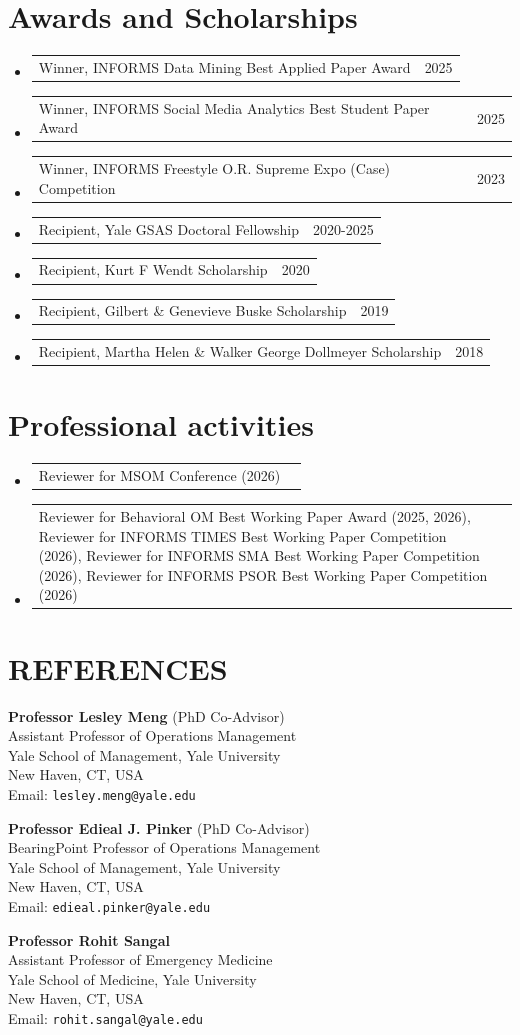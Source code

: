 \documentclass[letterpaper,11pt]{article}
\makeatletter
\newlength{\cvrowwidth}\setlength{\cvrowwidth}{0.97\textwidth}
\newcommand{\resumeProjectHeading}[2]{
    \item
    \begin{tabularx}{\cvrowwidth}{@{}>{\raggedright\arraybackslash\small}X@{\hspace{1em}}r@{}}
      #1 & #2 \\
    \end{tabularx}\vspace{-7pt}
}
\newcommand{\resumeSubHeadingListStartFlush}{\setlength{\cvrowwidth}{\textwidth}\begin{itemize}[leftmargin=0pt, label={}]}
\newcommand{\resumeSubHeadingListEnd}{\end{itemize}}
\makeatother
\begin{document}
\section{Awards and Scholarships}
\resumeSubHeadingListStartFlush
        \resumeProjectHeading{Winner, INFORMS Data Mining Best Applied Paper Award}{2025}
        \resumeProjectHeading
        {Winner, INFORMS Social Media Analytics Best Student Paper Award}{2025}
        \resumeProjectHeading
        {Winner, INFORMS Freestyle O.R. Supreme Expo (Case) Competition}{2023}
        \resumeProjectHeading
        {Recipient, Yale GSAS Doctoral Fellowship}{2020-2025}
        \resumeProjectHeading
        {Recipient, Kurt F Wendt Scholarship}{2020}
        \resumeProjectHeading
        {Recipient, Gilbert \& Genevieve Buske Scholarship}{2019}
        \resumeProjectHeading
        {Recipient, Martha Helen \& Walker George Dollmeyer Scholarship}{2018}

\resumeSubHeadingListEnd

\section{Professional activities}
    \resumeSubHeadingListStartFlush
        \resumeProjectHeading
        {Reviewer for MSOM Conference (2026)}{}
        \resumeProjectHeading
        {Reviewer for Behavioral OM Best Working Paper Award (2025, 2026), 
        Reviewer for INFORMS TIMES Best Working Paper Competition (2026),
        Reviewer for INFORMS SMA Best Working Paper Competition (2026),
        Reviewer for INFORMS PSOR Best Working Paper Competition (2026)}{}

          
    \resumeSubHeadingListEnd

\section{REFERENCES}

\begin{minipage}[t]{0.48\textwidth}
\textbf{Professor Lesley Meng} (PhD Co-Advisor)\\
Assistant Professor of Operations Management \\
Yale School of Management, Yale University \\
New Haven, CT, USA \\
Email: {\tt lesley.meng@yale.edu}
\end{minipage}
\hfill
\begin{minipage}[t]{0.48\textwidth}
\textbf{Professor Edieal J. Pinker} (PhD Co-Advisor)\\
BearingPoint Professor of Operations Management\\
Yale School of Management, Yale University \\
New Haven, CT, USA \\
Email: {\tt edieal.pinker@yale.edu}
\end{minipage}

\vspace{15pt}

\textbf{Professor Rohit Sangal} \\
Assistant Professor of Emergency Medicine\\
Yale School of Medicine, Yale University \\
New Haven, CT, USA \\
Email: {\tt rohit.sangal@yale.edu}
\end{document}
